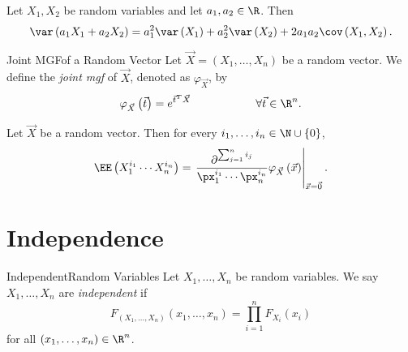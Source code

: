 \documentclass[stat333]{subfiles}
\begin{document}
    \begin{cor}{}
        Let $X_1,X_2$ be random variables and let $a_1,a_2\in\R$. Then
        \begin{equation*}
            \var\left( a_1X_1+a_2X_2 \right) = a_1^{2} \var\left( X_1 \right) + a_2^{2} \var\left( X_2 \right) + 2a_1a_2\cov\left( X_1,X_2 \right) .
        \end{equation*}
    \end{cor}	

    \begin{definition}{Joint MGF}{of a Random Vector}
        Let $\vec{X} = \left( X_1,\ldots,X_n \right) $ be a random vector. We define the \emph{joint mgf} of $\vec{X}$, denoted as $\varphi_{\vec{X}}$, by
        \begin{equation*}
            \varphi_{\vec{X}}\left( \vec{t} \right) = e^{\vec{t}^{T} \vec{X}} \hspace{2cm}\forall \vec{t}\in\R^n.
        \end{equation*}
    \end{definition}

    Let $\vec{X}$ be a random vector. Then for every $i_1,\ldots,i_n\in\N\cup\left\lbrace 0 \right\rbrace$,
    \begin{equation*}
        \EE\left( X_1^{i_1}\cdots X_n^{i_n} \right) = \left.\frac{\partial^{\sum^{n}_{j=1} i_j}}{\px_1^{i_1}\cdots\px_n^{i_n}}\varphi_{\vec{X}}\left( \vec{x} \right) \right|_{\vec{x}=\vec{0}}.
    \end{equation*}

    \clearpage
    \section{Independence}
    \begin{definition}{Independent}{Random Variables}
        Let $X_1,\ldots,X_n$ be random variables. We say $X_1,\ldots,X_n$ are \emph{independent} if
        \begin{equation*}
            F_{\left( X_1,\ldots,X_n \right) } \left( x_1,\ldots,x_n \right) = \prod^{n}_{i=1} F_{X_i}\left( x_i \right) 
        \end{equation*}
        for all $\left( x_1,\ldots,x_n \right) \in\R^n$.
    \end{definition}
\end{document}
